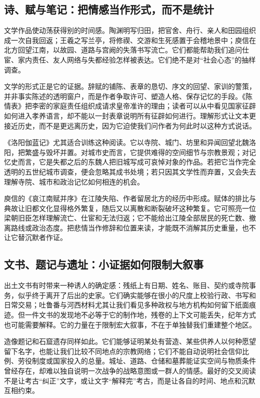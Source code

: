 \subsection{诗、赋与笔记：把情感当作形式，而不是统计}

文学作品使动荡获得别的时间感。陶渊明写归田，把官舍、舟行、亲人和田园组织成一次自我回返；王羲之写兰亭，将修禊、交游和生死感置于会稽地景中；庾信在北方回望江南，以故园、道路与宫阙的失落书写流亡。它们都能帮助我们追问仕宦、家内责任、友人网络与失都经验怎样被表达。它们绝不是对“社会心态”的抽样调查。

文学的形式正是它的证据。辞赋的铺陈、表章的恳切、序文的回望、家训的警策，并非事实陈述的透明窗户，而是作者争取许可、塑造人格、保存记忆的手段。《陈情表》把李密的家庭责任组织成请求皇帝准许的理由；读者可以从中看见国家征辟如何进入孝养语言，却不能以一封表章说明所有征辟如何进行。理解形式让文本更接近历史，而不是更远离历史，因为它迫使我们问作者为何此时以这种方式说话。

《洛阳伽蓝记》尤其适合训练这种阅读。它以寺院、城门、坊里和异闻回望北魏洛阳，把繁盛与毁坏并置。对城市史而言，它提供难得的空间细节与宗教景观；对记忆史而言，它是失都之后的东魏人把旧城写成可哀悼对象的作品。若把它当作完全透明的五世纪城市调查，便会忽略其成书处境；若只因其文学性而弃置，又会失去理解寺院、城市和政治记忆如何相连的机会。

\begin{textwindow}
庾信的《哀江南赋并序》在江陵失陷、作者留居北方的经历中形成。赋体的排比与典故让旧都文化显得格外繁复，随后又以离散和断裂破坏这种繁复。它可照亮一位梁朝旧臣怎样理解流亡、仕宦和无法归返；它不能给出江陵全部居民的死亡数、撤离路线或政治态度。把悲情当作修辞和位置来读，才能既不消解其历史重量，也不让它替沉默者作证。
\end{textwindow}

\subsection{文书、题记与遗址：小证据如何限制大叙事}

出土文书有时带来一种诱人的确定感：残纸上有日期、姓名、账目、契约或寺院事务，似乎终于离开了后出的史家。它们确实能够在很小的尺度上校验行政、书写和日常交易；吐鲁番与河西材料尤其让我们看见多种政权与地方机构如何留下纸面痕迹。但一件文书的发现地不必等于它的制作地，残卷的上下文可能丢失，纪年方式也可能需要解释。它的力量在于限制宏大叙事，不在于单独替我们重建整个地区。

造像题记和石窟遗存同样如此。它们能够证明某处有营造、某些供养人以何种愿望留下名字，也能让我们比较不同地点的宗教网络；它们不能自动说明社会信仰比例、劳役制度或国家投入的总量。城址、道路、仓储和墓葬能证实空间与物质条件曾经存在，却难以独自说明一次战争的战略意图或一群人的情感。最好的交叉阅读不是让考古“纠正”文字，或让文字“解释完”考古，而是让各自的时间、地点和沉默互相约束。

